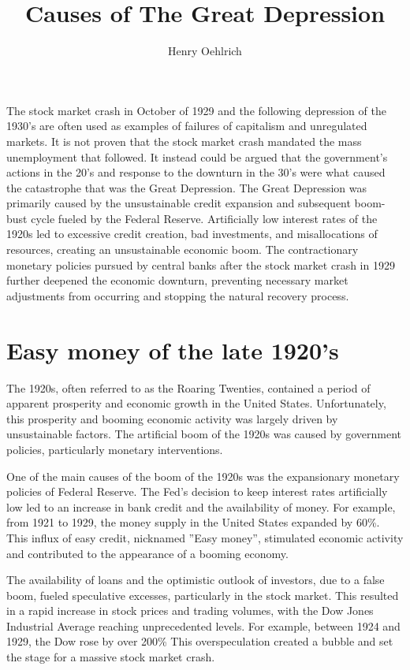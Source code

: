 \documentclass[12pt]{article}
\title{Causes of The Great Depression}
\author{Henry Oehlrich}
\begin{document}
\maketitle{}

The stock market crash in October of 1929 and the following depression of the
1930’s are often used as examples of failures of capitalism and unregulated
markets. It is not proven that the stock market crash mandated the mass
unemployment that followed. It instead could be argued that the government’s
actions in the 20’s and response to the downturn in the 30’s were what caused
the catastrophe that was the Great Depression. The Great Depression was
primarily caused by the unsustainable credit expansion and subsequent boom-bust
cycle fueled by the Federal Reserve. Artificially low interest rates of the
1920s led to excessive credit creation, bad investments, and misallocations of
resources, creating an unsustainable economic boom. The contractionary
monetary policies pursued by central banks after the stock market crash in 1929
further deepened the economic downturn, preventing necessary market adjustments
from occurring and stopping the natural recovery process.

\section{Easy money of the late 1920's}

The 1920s, often referred to as the Roaring Twenties, contained a period of
apparent prosperity and economic growth in the United States. Unfortunately,
this prosperity and booming economic activity was largely driven by
unsustainable factors. The artificial boom of the 1920s was caused by
government policies, particularly monetary interventions.

One of the main causes of the boom of the 1920s was the expansionary monetary
policies of Federal Reserve. The Fed’s decision to keep interest rates
artificially low led to an increase in bank credit and the availability of
money. For example, from 1921 to 1929, the money supply in the United States
expanded by 60\%\autocite{fredmoneysupply}. This influx of easy credit,
nicknamed ”Easy money”, stimulated economic activity and contributed to the
appearance of a booming economy.

The availability of loans and the optimistic outlook of investors, due to a
false boom, fueled speculative excesses, particularly in the stock market. This
resulted in a rapid increase in stock prices and trading volumes, with the Dow
Jones Industrial Average reaching unprecedented levels. For example, between
1924 and 1929, the Dow rose by over 200\%\autocite{macrotrendsdow} This
overspeculation created a bubble and set the stage for a massive stock market
crash.
\end{document}
